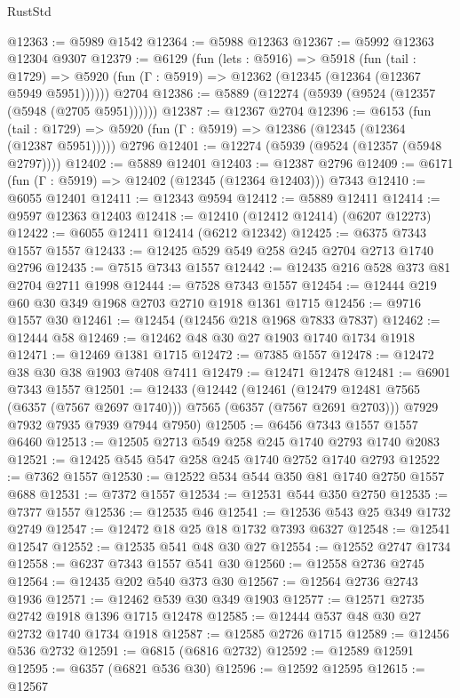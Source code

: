 \begin{lexlean}{RustStd}
\begin{coremodule}
@12363 := @5989 @1542
@12364 := @5988 @12363
@12367 := @5992 @12363 @12304 @9307
@12379 := @6129
    (fun (lets : @5916) =>
    @5918
      (fun (tail : @1729) =>
      @5920 (fun (Γ : @5919) => @12362 (@12345 (@12364 (@12367 @5949 @5951))))))
    @2704
@12386 := @5889 (@12274 (@5939 (@9524 (@12357 (@5948 (@2705 @5951))))))
@12387 := @12367 @2704
@12396 := @6153
    (fun (tail : @1729) => @5920 (fun (Γ : @5919) => @12386 (@12345 (@12364 (@12387 @5951)))))
    @2796
@12401 := @12274 (@5939 (@9524 (@12357 (@5948 @2797))))
@12402 := @5889 @12401
@12403 := @12387 @2796
@12409 := @6171 (fun (Γ : @5919) => @12402 (@12345 (@12364 @12403))) @7343
@12410 := @6055 @12401
@12411 := @12343 @9594
@12412 := @5889 @12411
@12414 := @9597 @12363 @12403
@12418 := @12410 (@12412 @12414) (@6207 @12273)
@12422 := @6055 @12411 @12414 (@6212 @12342)
@12425 := @6375 @7343 @1557 @1557
@12433 := @12425 @529 @549 @258 @245 @2704 @2713 @1740 @2796
@12435 := @7515 @7343 @1557
@12442 := @12435 @216 @528 @373 @81 @2704 @2711 @1998
@12444 := @7528 @7343 @1557
@12454 := @12444 @219 @60 @30 @349 @1968 @2703 @2710 @1918 @1361 @1715
@12456 := @9716 @1557 @30
@12461 := @12454 (@12456 @218 @1968 @7833 @7837)
@12462 := @12444 @58
@12469 := @12462 @48 @30 @27 @1903 @1740 @1734 @1918
@12471 := @12469 @1381 @1715
@12472 := @7385 @1557
@12478 := @12472 @38 @30 @38 @1903 @7408 @7411
@12479 := @12471 @12478
@12481 := @6901 @7343 @1557
@12501 := @12433
    (@12442
      (@12461 (@12479 @12481 @7565 (@6357 (@7567 @2697 @1740))) @7565 (@6357 (@7567 @2691 @2703)))
      @7929
      @7932
      @7935
      @7939
      @7944
      @7950)
@12505 := @6456 @7343 @1557 @1557 @6460
@12513 := @12505 @2713 @549 @258 @245 @1740 @2793 @1740 @2083
@12521 := @12425 @545 @547 @258 @245 @1740 @2752 @1740 @2793
@12522 := @7362 @1557
@12530 := @12522 @534 @544 @350 @81 @1740 @2750 @1557 @688
@12531 := @7372 @1557
@12534 := @12531 @544 @350 @2750
@12535 := @7377 @1557
@12536 := @12535 @46
@12541 := @12536 @543 @25 @349 @1732 @2749
@12547 := @12472 @18 @25 @18 @1732 @7393 @6327
@12548 := @12541 @12547
@12552 := @12535 @541 @48 @30 @27
@12554 := @12552 @2747 @1734
@12558 := @6237 @7343 @1557 @541 @30
@12560 := @12558 @2736 @2745
@12564 := @12435 @202 @540 @373 @30
@12567 := @12564 @2736 @2743 @1936
@12571 := @12462 @539 @30 @349 @1903
@12577 := @12571 @2735 @2742 @1918 @1396 @1715 @12478
@12585 := @12444 @537 @48 @30 @27 @2732 @1740 @1734 @1918
@12587 := @12585 @2726 @1715
@12589 := @12456 @536 @2732
@12591 := @6815 (@6816 @2732)
@12592 := @12589 @12591
@12595 := @6357 (@6821 @536 @30)
@12596 := @12592 @12595
@12615 := @12567

\end{coremodule}
\end{lexlean}
